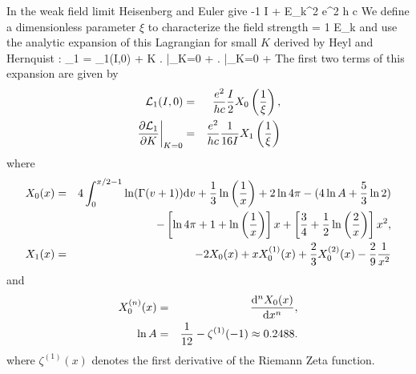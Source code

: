 In the weak field limit Heisenberg and Euler \cite{Heis36} give
\be
\lag \approx -{1 } I + E_k^2 {e^2 \over h c} 
\label{eq:heweak}
\ee
We define a dimensionless parameter $\xi$ to characterize the field
strength
\be
\xi = {1 \over E_k} 
\ee
and use the analytic expansion of this Lagrangian for small $K$
derived by Heyl and Hernquist \cite{Heyl96a}:
\be
\lag_1 = \lag_1(I,0) + K \left .  \right |_{K=0} +
 \left .  \right
|_{K=0} + \cdots
\label{eq:lag1exp}
\ee
The first two terms of this expansion are given by
\begin{eqnarray}
{\cal L}_1(I,0) & = & {e^2 \over h c} \frac{I}{2}
X_0\left(\frac{1}{\xi}\right), \\
 \left . \frac{\partial {\cal L}_1}{\partial K} \right |_{K=0} & = & {e^2 \over h c}
\frac{1}{16 I} X_1\left(\frac{1}{\xi}\right) 
\end{eqnarray}
where
\begin{eqnarray}
X_0(x) & = & 4 \int_0^{x/2-1} \ln(\Gamma(v+1)) {\rm d} v
+ \frac{1}{3} \ln \left ( \frac{1}{x} \right )
+ 2 \ln 4\pi - (4 \ln A+\frac{5}{3} \ln 2) \nonumber \\
& & ~~ - \left [ \ln 4\pi + 1 +  \ln \left ( \frac{1}{x} \right ) \right ] x
+ \left [ \frac{3}{4} + \frac{1}{2} \ln \left ( \frac{2}{x} \right )
\right ] x^2,
\label{eq:x0anal} \\
X_1(x) & = & - 2 X_0(x) + x X_0^{(1)}(x) + \frac{2}{3} X_0^{(2)} (x) -
\frac{2}{9} \frac{1}{x^2}
\label{eq:x1anal} 
\end{eqnarray}
and
\begin{eqnarray}
X_0^{(n)}(x) &=& \frac{{\rm d}^n X_0(x)}{{\rm d} x^n}, \\
\ln A &=& \frac{1}{12} - \zeta^{(1)}(-1) \approx 0.2488.
\end{eqnarray}
where $\zeta^{(1)}(x)$ denotes the first derivative of the Riemann Zeta function.

